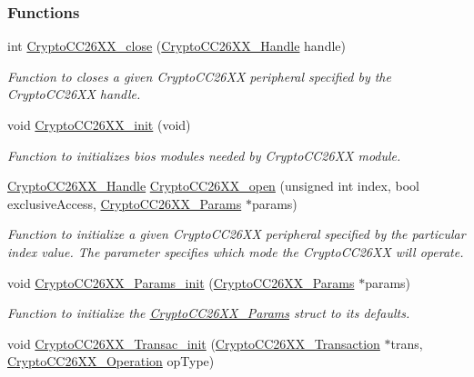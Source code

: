 \subsubsection*{Functions}
\begin{DoxyCompactItemize}
\item 
int \hyperlink{_crypto_c_c26_x_x_8h_aa2ece822f0fd8f6dbd3f50500b03bea4}{Crypto\-C\-C26\-X\-X\-\_\-close} (\hyperlink{_crypto_c_c26_x_x_8h_a8737c63107a1cb5548ba06f7a48259b5}{Crypto\-C\-C26\-X\-X\-\_\-\-Handle} handle)
\begin{DoxyCompactList}\small\item\em Function to closes a given Crypto\-C\-C26\-X\-X peripheral specified by the Crypto\-C\-C26\-X\-X handle. \end{DoxyCompactList}\item 
void \hyperlink{_crypto_c_c26_x_x_8h_a512b301a6ebf10a41c86d9ff725f7749}{Crypto\-C\-C26\-X\-X\-\_\-init} (void)
\begin{DoxyCompactList}\small\item\em Function to initializes bios modules needed by Crypto\-C\-C26\-X\-X module. \end{DoxyCompactList}\item 
\hyperlink{_crypto_c_c26_x_x_8h_a8737c63107a1cb5548ba06f7a48259b5}{Crypto\-C\-C26\-X\-X\-\_\-\-Handle} \hyperlink{_crypto_c_c26_x_x_8h_a21aa1458d0b063ee3637a40487e8ee12}{Crypto\-C\-C26\-X\-X\-\_\-open} (unsigned int index, bool exclusive\-Access, \hyperlink{struct_crypto_c_c26_x_x___params}{Crypto\-C\-C26\-X\-X\-\_\-\-Params} $\ast$params)
\begin{DoxyCompactList}\small\item\em Function to initialize a given Crypto\-C\-C26\-X\-X peripheral specified by the particular index value. The parameter specifies which mode the Crypto\-C\-C26\-X\-X will operate. \end{DoxyCompactList}\item 
void \hyperlink{_crypto_c_c26_x_x_8h_a057c8155f3a7eb9560a51e2d8d4d98e3}{Crypto\-C\-C26\-X\-X\-\_\-\-Params\-\_\-init} (\hyperlink{struct_crypto_c_c26_x_x___params}{Crypto\-C\-C26\-X\-X\-\_\-\-Params} $\ast$params)
\begin{DoxyCompactList}\small\item\em Function to initialize the \hyperlink{struct_crypto_c_c26_x_x___params}{Crypto\-C\-C26\-X\-X\-\_\-\-Params} struct to its defaults. \end{DoxyCompactList}\item 
void \hyperlink{_crypto_c_c26_x_x_8h_afb3ea8faceda234cdd62c5f53e203946}{Crypto\-C\-C26\-X\-X\-\_\-\-Transac\-\_\-init} (\hyperlink{struct_crypto_c_c26_x_x___transaction}{Crypto\-C\-C26\-X\-X\-\_\-\-Transaction} $\ast$trans, \hyperlink{_crypto_c_c26_x_x_8h_a28465385e5b45efecc00f2015605f970}{Crypto\-C\-C26\-X\-X\-\_\-\-Operation} op\-Type)

\end{DoxyCompactItemize}
